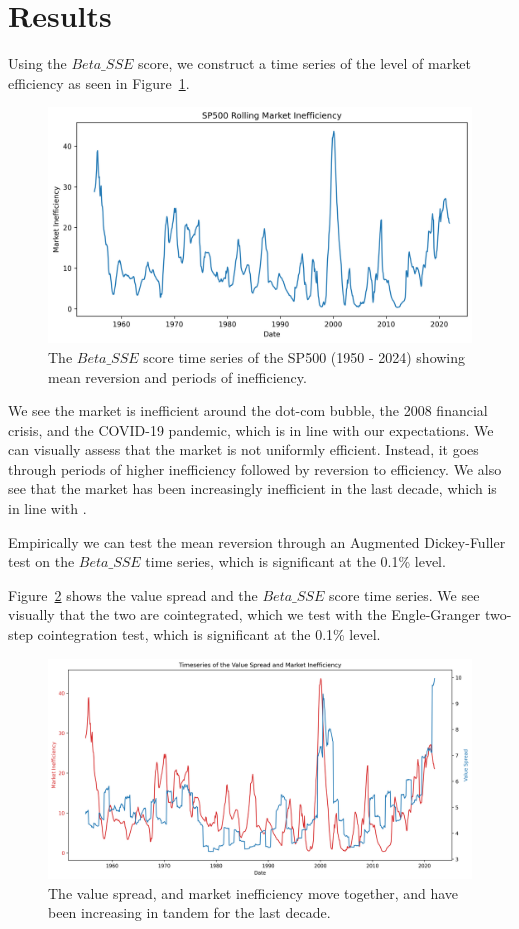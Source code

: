 \section{Results}
\label{sec:results}

Using the $Beta\_SSE$ score, we construct a time series of the level of market efficiency as seen in Figure~\ref{fig:sp_500_SSE_beta_ts}.
\begin{figure}[h!]
    \centering
    \includegraphics[width=1\textwidth]{../figs/SP500 Rolling Market Inefficiency.png}
    \caption{The $Beta\_SSE$ score time series of the SP500 (1950 - 2024) showing mean reversion and periods of inefficiency.}
    \label{fig:sp_500_SSE_beta_ts}
\end{figure}

We see the market is inefficient around the dot-com bubble, the 2008 financial crisis, and the COVID-19 pandemic, which is in line with our expectations.
We can visually assess that the market is not uniformly efficient. Instead, it goes through periods of higher inefficiency followed by reversion to efficiency.
We also see that the market has been increasingly inefficient in the last decade, which is in line with \citet{asness_2024}.

Empirically we can test the mean reversion through an Augmented Dickey-Fuller test \citep{cheung1995lag} on the $Beta\_SSE$ time series, which is significant at the 0.1\% level.

Figure~\ref{value_spread_beta_sse} shows the value spread and the $Beta\_SSE$ score time series. We see visually that the two are cointegrated, which we test with
the Engle-Granger two-step cointegration test, which is significant at the 0.1\% level.

\begin{figure}[h!]
    \centering
    \includegraphics[width=1\textwidth]{../figs/Value Spread and Market Inefficiency.png}
    \caption{The value spread, and market inefficiency move together, and have been increasing in tandem for the last decade.}
    \label{value_spread_beta_sse}
\end{figure}
